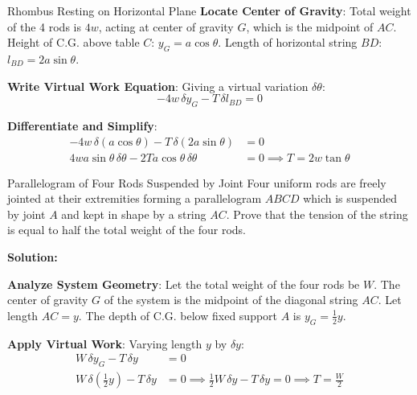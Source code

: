 \begin{examplebox}{Rhombus Resting on Horizontal Plane}
\textbf{Locate Center of Gravity}:
    Total weight of the 4 rods is $4w$, acting at center of gravity $G$, which is the midpoint of $AC$.
    Height of C.G. above table $C$: $y_G = a \cos\theta$.
    Length of horizontal string $BD$: $l_{BD} = 2a \sin\theta$.

\textbf{Write Virtual Work Equation}:
    Giving a virtual variation $\delta\theta$:
    \begin{equation*}
        -4w \, \delta y_G - T \, \delta l_{BD} = 0
    \end{equation*}

\textbf{Differentiate and Simplify}:
    \begin{align*}
        -4w \, \delta(a \cos\theta) - T \, \delta(2a \sin\theta) &= 0 \\
        4w a \sin\theta \, \delta\theta - 2T a \cos\theta \, \delta\theta &= 0 \implies T = 2w \tan\theta
    \end{align*}
\end{examplebox}

\begin{examplebox}{Parallelogram of Four Rods Suspended by Joint}
Four uniform rods are freely jointed at their extremities forming a parallelogram $ABCD$ which is suspended by joint $A$ and kept in shape by a string $AC$. Prove that the tension of the string is equal to half the total weight of the four rods.

\tcblower
\textbf{Solution:}


\textbf{Analyze System Geometry}:
    Let the total weight of the four rods be $W$.
    The center of gravity $G$ of the system is the midpoint of the diagonal string $AC$.
    Let length $AC = y$. The depth of C.G. below fixed support $A$ is $y_G = \frac{1}{2}y$.

\textbf{Apply Virtual Work}:
    Varying length $y$ by $\delta y$:
    \begin{align*}
        W \, \delta y_G - T \, \delta y &= 0 \\
        W \, \delta\left(\frac{1}{2}y\right) - T \, \delta y &= 0 \implies \frac{1}{2}W \, \delta y - T \, \delta y = 0 \implies T = \frac{W}{2}
    \end{align*}
\end{examplebox}

